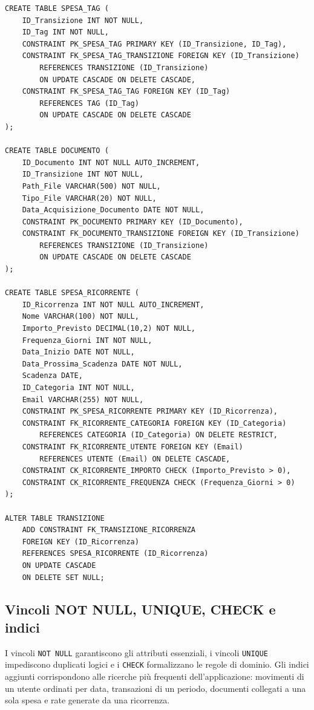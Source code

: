 \documentclass[11pt,a4paper]{article}
\begin{document}
\begin{lstlisting}[caption={Relazioni SPESA\_TAG, DOCUMENTO e SPESA\_RICORRENTE}]
CREATE TABLE SPESA_TAG (
    ID_Transizione INT NOT NULL,
    ID_Tag INT NOT NULL,
    CONSTRAINT PK_SPESA_TAG PRIMARY KEY (ID_Transizione, ID_Tag),
    CONSTRAINT FK_SPESA_TAG_TRANSIZIONE FOREIGN KEY (ID_Transizione)
        REFERENCES TRANSIZIONE (ID_Transizione)
        ON UPDATE CASCADE ON DELETE CASCADE,
    CONSTRAINT FK_SPESA_TAG_TAG FOREIGN KEY (ID_Tag)
        REFERENCES TAG (ID_Tag)
        ON UPDATE CASCADE ON DELETE CASCADE
);

CREATE TABLE DOCUMENTO (
    ID_Documento INT NOT NULL AUTO_INCREMENT,
    ID_Transizione INT NOT NULL,
    Path_File VARCHAR(500) NOT NULL,
    Tipo_File VARCHAR(20) NOT NULL,
    Data_Acquisizione_Documento DATE NOT NULL,
    CONSTRAINT PK_DOCUMENTO PRIMARY KEY (ID_Documento),
    CONSTRAINT FK_DOCUMENTO_TRANSIZIONE FOREIGN KEY (ID_Transizione)
        REFERENCES TRANSIZIONE (ID_Transizione)
        ON UPDATE CASCADE ON DELETE CASCADE
);

CREATE TABLE SPESA_RICORRENTE (
    ID_Ricorrenza INT NOT NULL AUTO_INCREMENT,
    Nome VARCHAR(100) NOT NULL,
    Importo_Previsto DECIMAL(10,2) NOT NULL,
    Frequenza_Giorni INT NOT NULL,
    Data_Inizio DATE NOT NULL,
    Data_Prossima_Scadenza DATE NOT NULL,
    Scadenza DATE,
    ID_Categoria INT NOT NULL,
    Email VARCHAR(255) NOT NULL,
    CONSTRAINT PK_SPESA_RICORRENTE PRIMARY KEY (ID_Ricorrenza),
    CONSTRAINT FK_RICORRENTE_CATEGORIA FOREIGN KEY (ID_Categoria)
        REFERENCES CATEGORIA (ID_Categoria) ON DELETE RESTRICT,
    CONSTRAINT FK_RICORRENTE_UTENTE FOREIGN KEY (Email)
        REFERENCES UTENTE (Email) ON DELETE CASCADE,
    CONSTRAINT CK_RICORRENTE_IMPORTO CHECK (Importo_Previsto > 0),
    CONSTRAINT CK_RICORRENTE_FREQUENZA CHECK (Frequenza_Giorni > 0)
);

ALTER TABLE TRANSIZIONE
    ADD CONSTRAINT FK_TRANSIZIONE_RICORRENZA
    FOREIGN KEY (ID_Ricorrenza)
    REFERENCES SPESA_RICORRENTE (ID_Ricorrenza)
    ON UPDATE CASCADE
    ON DELETE SET NULL;
\end{lstlisting}

\subsection{Vincoli NOT NULL, UNIQUE, CHECK e indici}
I vincoli \texttt{NOT NULL} garantiscono gli attributi essenziali, i vincoli \texttt{UNIQUE} impediscono duplicati logici e i \texttt{CHECK} formalizzano le regole di dominio. Gli indici aggiunti corrispondono alle ricerche più frequenti dell'applicazione: movimenti di un utente ordinati per data, transazioni di un periodo, documenti collegati a una sola spesa e rate generate da una ricorrenza.
\end{document}
